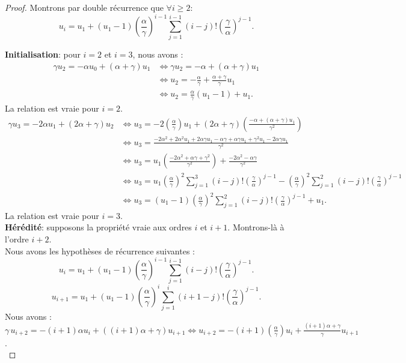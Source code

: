 \documentclass[12pt,a4paper]{report}
\theoremstyle{remark}
\begin{document}
\begin{proof}
Montrons par double récurrence que $\forall i \geqslant 2$:
$$u_i = u_1 + (u_1 - 1)\left(\frac{\alpha}{\gamma}\right)^{i-1} \sum_{j=1}^{i-1}(i-j)!\left(\frac{\gamma}{\alpha}\right)^{j-1}.$$

\textbf{Initialisation}: pour $i=2$ et $i=3$, nous avons :
\begin{align*}
\gamma u_2 = -\alpha u_0 + (\alpha + \gamma) u_1 &\iff \gamma u_2 = - \alpha + (\alpha + \gamma)u_1 \\
&\iff u_2 = - \frac{\alpha}{\gamma} + \frac{\alpha + \gamma}{\gamma} u_1 \\
&\iff u_2 = \frac{\alpha}{\gamma}(u_1 - 1) + u_1.
\end{align*}
La relation est vraie pour $i=2$.
\begin{align*}
\gamma u_3 = -2 \alpha u_1 + (2 \alpha + \gamma) u_2 &\iff u_3 = -2 \left(\frac{\alpha}{\gamma}\right) u_1 + (2 \alpha + \gamma)\left(\frac{-\alpha + (\alpha + \gamma) u_1}{\gamma^2}\right) \\
&\iff u_3 = \frac{-2 \alpha^2 + 2 \alpha^2 u_1 + 2 \alpha \gamma u_1 - \alpha \gamma + \alpha \gamma u_1 + \gamma^2 u_1 -2 \alpha \gamma u_1}{\gamma^2} \\
&\iff u_3 = u_1 \left(\frac{-2 \alpha^2 + \alpha \gamma + \gamma^2}{\gamma^2}\right) + \frac{-2 \alpha^2 - \alpha \gamma}{\gamma^2} \\
&\iff u_3 = u_1 \left(\frac{\alpha}{\gamma}\right)^{2} \sum_{j=1}^{3}(i-j)!\left(\frac{\gamma}{\alpha}\right)^{j-1} - \left(\frac{\alpha}{\gamma}\right)^{2} \sum_{j=1}^{2}(i-j)!\left(\frac{\gamma}{\alpha}\right)^{j-1} \\
&\iff u_3 = (u_1 - 1)\left(\frac{\alpha}{\gamma}\right)^{2} \sum_{j=1}^{2}(i-j)!\left(\frac{\gamma}{\alpha}\right)^{j-1} + u_1.
\end{align*}
La relation est vraie pour $i=3$.\\

\textbf{Hérédité}: supposons la propriété vraie aux ordres $i$ et $i+1$. Montrons-là à l'ordre $i+2$.\\

Nous avons les hypothèses de récurrence suivantes : 
$$u_i = u_1 + (u_1 - 1)\left(\frac{\alpha}{\gamma}\right)^{i-1} \sum_{j=1}^{i-1}(i-j)!\left(\frac{\gamma}{\alpha}\right)^{j-1}.$$
$$u_{i+1} = u_1 + (u_1 - 1)\left(\frac{\alpha}{\gamma}\right)^{i} \sum_{j=1}^{i}(i+1-j)!\left(\frac{\gamma}{\alpha}\right)^{j-1}
.$$
Nous avons : $\gamma \, u_{i+2} = -(i+1) \alpha u_i + ((i+1) \alpha + \gamma) u_{i+1} \iff u_{i+2} = -(i+1) \left(\frac{\alpha}{\gamma}\right) u_i + \frac{(i+1) \alpha + \gamma}{\gamma} u_{i+1}$.
\\


\end{proof}
\end{document}

